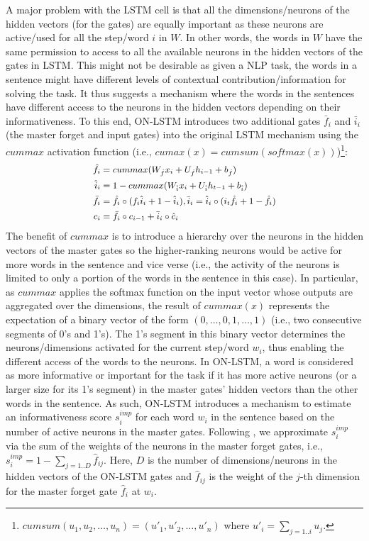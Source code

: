 \documentclass[11pt,a4paper]{article}
\begin{document}
A major problem with the LSTM cell is that all the dimensions/neurons of the hidden vectors (for the gates) are equally important as these neurons are active/used for all the step/word $i$ in $W$. In other words, the words in $W$ have the same permission to access to all the available neurons in the hidden vectors of the gates in LSTM. This might not be desirable as given a NLP task, the words in a sentence might have different levels of contextual contribution/information for solving the task. It thus suggests a mechanism where the words in the sentences have different access to the neurons in the hidden vectors depending on their informativeness. To this end, ON-LSTM introduces two additional gates $\bar{f}_i$ and $\bar{i}_i$ (the master forget and input gates) into the original LSTM mechanism using the $cummax$ activation function (i.e., $cumax(x) = cumsum(softmax(x))$)\footnote{$cumsum(u_1,u_2,\ldots, u_n) = (u'_1,u'_2,\ldots,u'_n)$ where $u'_i = \sum_{j=1..i}u_j$.}:
\begin{equation}
\small
\begin{split}
    \hat{f}_i & = cummax(W_{\hat{f}}x_i+U_{\hat{f}}h_{i-1}+b_{\hat{f}}) \\
    \hat{i}_i & = 1- cummax(W_{\hat{i}}x_i+U_{\hat{i}}h_{t-1}+b_{\hat{i}}) \\
    \bar{f}_i & = \hat{f}_i \circ (f_i \hat{i}_i + 1 - \hat{i}_i), \bar{i}_i = \hat{i}_i \circ (i_t \hat{f}_i + 1 - \hat{f}_i) \\
    c_i & = \bar{f}_i \circ c_{i-1} + \bar{i}_i \circ \hat{c}_i 
\end{split}
\label{eq:2}
\end{equation}
The benefit of $cummax$ is to introduce a hierarchy over the neurons in the hidden vectors of the master gates so the higher-ranking neurons would be active for more words in the sentence and vice verse (i.e., the activity of the neurons is limited to only a portion of the words in the sentence in this case). In particular, as $cummax$ applies the softmax function on the input vector whose outputs are aggregated over the dimensions, the result of $cummax(x)$ represents the expectation of a binary vector of the form $(0,\ldots,0,1,\ldots,1)$ (i.e., two consecutive segments of 0's and 1's). The 1's segment in this binary vector determines the neurons/dimensions activated for the current step/word $w_i$, thus enabling the different access of the words to the neurons. In ON-LSTM, a word is considered as more informative or important for the task if it has more active neurons (or a larger size for its 1's segment) in the master gates' hidden vectors than the other words in the sentence. As such, ON-LSTM introduces a mechanism to estimate an informativeness score $s^{imp}_i$ for each word $w_i$ in the sentence based on the number of active neurons in the master gates. Following \citep{Shen2019ordered}, we approximate $s^{imp}_i$ via the sum of the weights of the neurons in the master forget gates, i.e., $s^{imp}_i = 1- \sum_{j=1..D} \hat{f}_{ij}$. Here, $D$ is the number of dimensions/neurons in the hidden vectors of the ON-LSTM gates and $\hat{f}_{ij}$ is the weight of the $j$-th dimension for the master forget gate $\hat{f}_i$ at $w_i$.
\end{document}
